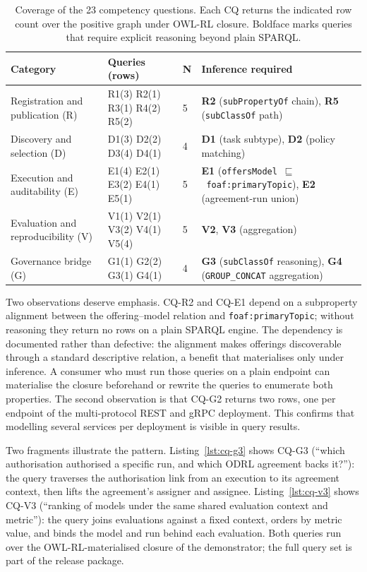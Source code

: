\documentclass[Afour,sagev,times]{sagej}
\newcommand{\code}[1]{\texttt{#1}}
\begin{document}
\begin{table}[t]
\small\sf\centering
\caption{Coverage of the 23 competency questions. Each CQ returns the indicated row count over the positive graph under OWL-RL closure. Boldface marks queries that require explicit reasoning beyond plain SPARQL.\label{tab:cqs}}
\begin{tabular}{@{}p{3.3cm}p{2.6cm}p{0.8cm}p{6.3cm}@{}}
\toprule
\textbf{Category} & \textbf{Queries (rows)} & \textbf{N} & \textbf{Inference required} \\
\midrule
Registration and publication (R) & R1(3) R2(1) R3(1) R4(2) R5(2) & 5 & \textbf{R2} (\code{subPropertyOf} chain), \textbf{R5} (\code{subClassOf} path) \\
Discovery and selection (D) & D1(3) D2(2) D3(4) D4(1) & 4 & \textbf{D1} (task subtype), \textbf{D2} (policy matching) \\
Execution and auditability (E) & E1(4) E2(1) E3(2) E4(1) E5(1) & 5 & \textbf{E1} (\code{offersModel}~$\sqsubseteq$~\code{foaf:primaryTopic}), \textbf{E2} (agreement-run union) \\
Evaluation and reproducibility (V) & V1(1) V2(1) V3(2) V4(1) V5(4) & 5 & \textbf{V2}, \textbf{V3} (aggregation) \\
Governance bridge (G) & G1(1) G2(2) G3(1) G4(1) & 4 & \textbf{G3} (\code{subClassOf} reasoning), \textbf{G4} (\code{GROUP\_CONCAT} aggregation) \\
\bottomrule
\end{tabular}
\end{table}

Two observations deserve emphasis. CQ-R2 and CQ-E1 depend on a subproperty alignment between the offering--model relation and \code{foaf:primaryTopic}; without reasoning they return no rows on a plain SPARQL engine. The dependency is documented rather than defective: the alignment makes offerings discoverable through a standard descriptive relation, a benefit that materialises only under inference. A consumer who must run those queries on a plain endpoint can materialise the closure beforehand or rewrite the queries to enumerate both properties. The second observation is that CQ-G2 returns two rows, one per endpoint of the multi-protocol REST and gRPC deployment. This confirms that modelling several services per deployment is visible in query results.

Two fragments illustrate the pattern. Listing~\ref{lst:cq-g3} shows CQ-G3 (``which authorisation authorised a specific run, and which ODRL agreement backs it?''): the query traverses the authorisation link from an execution to its agreement context, then lifts the agreement's assigner and assignee. Listing~\ref{lst:cq-v3} shows CQ-V3 (``ranking of models under the same shared evaluation context and metric''): the query joins evaluations against a fixed context, orders by metric value, and binds the model and run behind each evaluation. Both queries run over the OWL-RL-materialised closure of the demonstrator; the full query set is part of the release package.
\end{document}
